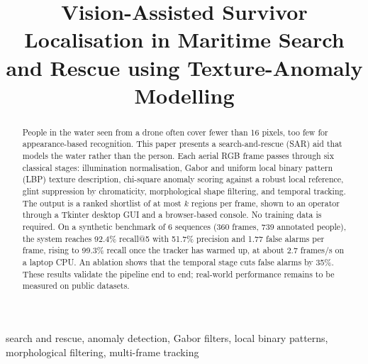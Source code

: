 \documentclass[conference,a4paper]{IEEEtran}
\begin{document}
\title{Vision-Assisted Survivor Localisation in Maritime Search and Rescue using Texture-Anomaly Modelling}

\author{
\and
{}
\and
{}
}

\maketitle

\begin{abstract}
People in the water seen from a drone often cover fewer than 16 pixels, too few for appearance-based recognition. This paper presents a search-and-rescue (SAR) aid that models the water rather than the person. Each aerial RGB frame passes through six classical stages: illumination normalisation, Gabor and uniform local binary pattern (LBP) texture description, chi-square anomaly scoring against a robust local reference, glint suppression by chromaticity, morphological shape filtering, and temporal tracking. The output is a ranked shortlist of at most $k$ regions per frame, shown to an operator through a Tkinter desktop GUI and a browser-based console. No training data is required. On a synthetic benchmark of 6 sequences (360 frames, 739 annotated people), the system reaches 92.4\% recall@5 with 51.7\% precision and 1.77 false alarms per frame, rising to 99.3\% recall once the tracker has warmed up, at about 2.7 frames/s on a laptop CPU. An ablation shows that the temporal stage cuts false alarms by 35\%. These results validate the pipeline end to end; real-world performance remains to be measured on public datasets.
\end{abstract}

\begin{IEEEkeywords}
search and rescue, anomaly detection, Gabor filters, local binary patterns, morphological filtering, multi-frame tracking
\end{IEEEkeywords}

\end{document}
